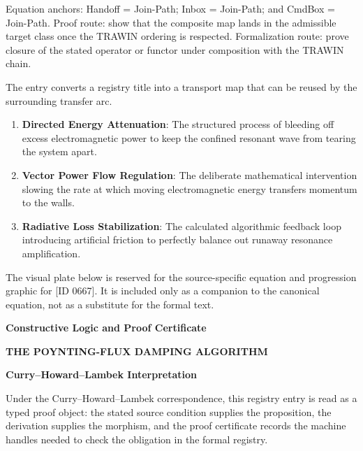 Equation anchors: Handoff = Join-Path; Inbox = Join-Path; and CmdBox = Join-Path. Proof route: show that the composite map lands in the admissible target class once the TRAWIN ordering is respected. Formalization route: prove closure of the stated operator or functor under composition with the TRAWIN chain.

The entry converts a registry title into a transport map that can be reused by the surrounding transfer arc.
\endgroup

\begin{enumerate}[leftmargin=1.6em,itemsep=6pt,topsep=4pt]
\item \textbf{Directed Energy Attenuation}: The structured process of bleeding off excess electromagnetic power to keep the confined resonant wave from tearing the system apart.
\item \textbf{Vector Power Flow Regulation}: The deliberate mathematical intervention slowing the rate at which moving electromagnetic energy transfers momentum to the walls.
\item \textbf{Radiative Loss Stabilization}: The calculated algorithmic feedback loop introducing artificial friction to perfectly balance out runaway resonance amplification.
\end{enumerate}

\begingroup\footnotesize\sloppy
The visual plate below is reserved for the source-specific equation and progression graphic for [ID 0667]. It is included only as a companion to the canonical equation, not as a substitute for the formal text.
\par\endgroup
\ifTZPDarkEdition
{}
\fi

\clearpage
\begingroup\tzpsupportsetup
\noindent\textbf{\fontsize{10.8pt}{12.8pt}\selectfont [ID 0667] Constructive Logic and Proof Certificate}\par
\noindent\textbf{\fontsize{10pt}{12pt}\selectfont THE POYNTING-FLUX DAMPING ALGORITHM}\par
\vspace{0.45em}
\begingroup
\footnotesize
\setlength{\parskip}{0.22em}
\setlength{\parindent}{0pt}
\noindent\textbf{Curry--Howard--Lambek Interpretation}\par
Under the Curry--Howard--Lambek correspondence, this registry entry is read as a typed proof
object: the stated source condition supplies the proposition, the derivation supplies the
morphism, and the proof certificate records the machine handles needed to check the obligation
in the formal registry.

